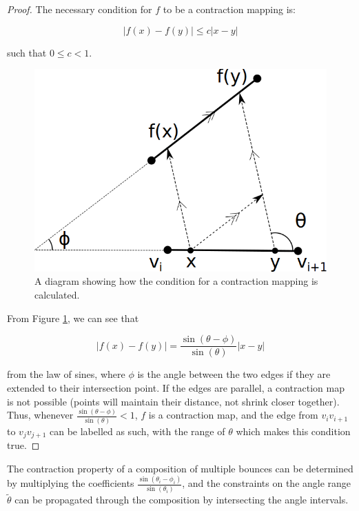 \documentclass[]{styles/svproc}  %
\begin{document}
\begin{proof}
The necessary condition for $f$ to be a contraction mapping is:

\begin{equation*}
|f(x) - f(y)| \leq c |x-y|
\end{equation*}

such that $0 \leq c < 1$.

\begin{figure}
    \includegraphics[width=0.5\linewidth]{figures/contraction_map_cond.png}
    \centering
    \caption{A diagram showing how the condition for a contraction mapping is
calculated. \label{fig:cont_map}}
    \centering
\end{figure}

From Figure \ref{fig:cont_map}, we can see that

\begin{equation*}
|f(x) - f(y)| = \frac{\sin(\theta - \phi)}{\sin(\theta)} |x-y|
\end{equation*}

from the law of sines, where $\phi$ is the angle between the two edges if they
are extended to their intersection point. If the edges are parallel, a
contraction map is not possible (points will maintain their distance, not shrink
closer together). Thus, whenever $\frac{\sin(\theta - \phi)}{\sin(\theta)}
< 1$, $f$ is a contraction map, and the edge from $v_i v_{i+1}$ to $v_j
v_{j+1}$ can be labelled as such, with the range of $\theta$ which makes this
condition true.

\end{proof}

\begin{corollary}
The contraction property of a composition of multiple bounces can
be determined by multiplying the coefficients $\frac{\sin(\theta_i -
\phi_i)}{\sin(\theta_i)}$, and the constraints on the angle range
$\tilde{\theta}$ can be propagated through the composition by intersecting the angle
intervals.
\end{corollary}
\end{document}

